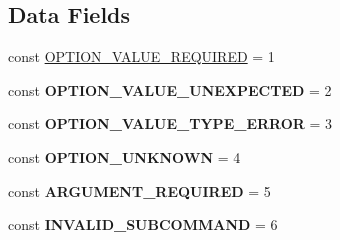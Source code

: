 \subsection*{Data Fields}
\begin{DoxyCompactItemize}
\item 
const \hyperlink{class_console___command_line___exception_a6c8de7ca8e71c28392907f2b23d6ed76}{OPTION\_\-VALUE\_\-REQUIRED} = 1
\item 
\hypertarget{class_console___command_line___exception_a3618878001f1847b721a339def27a774}{
const {\bfseries OPTION\_\-VALUE\_\-UNEXPECTED} = 2}
\label{class_console___command_line___exception_a3618878001f1847b721a339def27a774}

\item 
\hypertarget{class_console___command_line___exception_a2e7eef4681975b73f879d71542ed4f73}{
const {\bfseries OPTION\_\-VALUE\_\-TYPE\_\-ERROR} = 3}
\label{class_console___command_line___exception_a2e7eef4681975b73f879d71542ed4f73}

\item 
\hypertarget{class_console___command_line___exception_a34a9eb37b647330ee2b902dae484ae46}{
const {\bfseries OPTION\_\-UNKNOWN} = 4}
\label{class_console___command_line___exception_a34a9eb37b647330ee2b902dae484ae46}

\item 
\hypertarget{class_console___command_line___exception_a95f7fd4884a2ce6bfe0d6f586bae1c7a}{
const {\bfseries ARGUMENT\_\-REQUIRED} = 5}
\label{class_console___command_line___exception_a95f7fd4884a2ce6bfe0d6f586bae1c7a}

\item 
\hypertarget{class_console___command_line___exception_a9a22ebeb94c916d7fd06e46da8c34f87}{
const {\bfseries INVALID\_\-SUBCOMMAND} = 6}
\label{class_console___command_line___exception_a9a22ebeb94c916d7fd06e46da8c34f87}

\end{DoxyCompactItemize}


